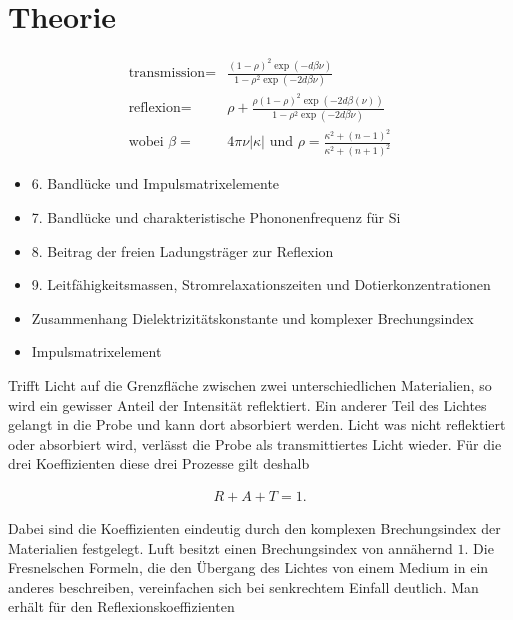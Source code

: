 \documentclass[paper=a4,fontsize=10pt,DIV=18,twocolumn,parskip=half]{scrartcl}
\numberwithin{equation}{section}    %
\begin{document}

\section{Theorie}
\begin{align}
    \text{transmission}= & \frac{(1-\rho)^2 \exp(-d\beta \nu )}{1-\rho^2 \exp 
    (-2d\beta\nu)} \\
    \text{reflexion}= & \rho+\frac{\rho (1-\rho)^2 \exp (-2 d \beta (\nu 
    ))}{1-\rho^2 \exp(-2 d \beta \nu )}\\
    \text{wobei } \beta= & 4 \pi  \nu  \left| \kappa \right|
    \text{ und }\rho= \frac{\kappa ^2+(n-1)^2}{\kappa ^2+(n+1)^2}
    \label{trans}
\end{align}

\begin{itemize}
\item 6. Bandlücke und Impulsmatrixelemente
\item 7. Bandlücke und charakteristische Phononenfrequenz für Si
\item 8. Beitrag der freien Ladungsträger zur Reflexion
\item 9. Leitfähigkeitsmassen, Stromrelaxationszeiten und Dotierkonzentrationen
\end{itemize}


\begin{itemize}
\item Zusammenhang Dielektrizitätskonstante und komplexer Brechungsindex
\item Impulsmatrixelement
\end{itemize}
Trifft Licht auf die Grenzfläche zwischen zwei unterschiedlichen Materialien, so wird ein gewisser Anteil der Intensität reflektiert. Ein anderer Teil des Lichtes gelangt in die Probe und kann dort absorbiert werden. Licht was nicht reflektiert oder absorbiert wird, verlässt die Probe als transmittiertes Licht wieder. Für die drei Koeffizienten diese drei Prozesse gilt deshalb

\begin{align}
    R+A+T=1.
\end{align}

Dabei sind die Koeffizienten eindeutig durch den komplexen Brechungsindex der Materialien festgelegt. Luft besitzt einen Brechungsindex von annähernd $1$.
Die Fresnelschen Formeln, die den Übergang des Lichtes von einem Medium in ein anderes beschreiben, vereinfachen sich bei senkrechtem Einfall deutlich. Man erhält für den Reflexionskoeffizienten
\end{document}
